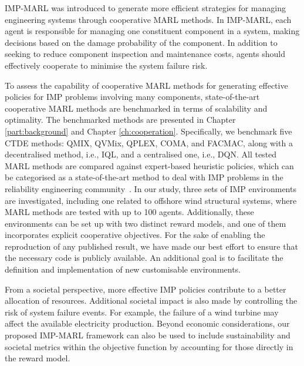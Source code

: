 IMP-MARL was introduced to generate more efficient strategies for managing engineering systems through cooperative MARL methods.
In IMP-MARL, each agent is responsible for managing one constituent component in a system, making decisions based on the damage probability of the component.
In addition to seeking to reduce component inspection and maintenance costs, agents should effectively cooperate to minimise the system failure risk.

To assess the capability of cooperative MARL methods for generating effective policies for IMP problems involving many components, state-of-the-art cooperative MARL methods are benchmarked in terms of scalability and optimality.
The benchmarked methods are presented in Chapter \ref{part:background} and Chapter \ref{ch:cooperation}.
Specifically, we benchmark five CTDE methods: QMIX, QVMix, QPLEX, COMA, and FACMAC, along with a decentralised method, i.e., IQL, and a centralised one, i.e., DQN.
All tested MARL methods are compared against expert-based heuristic policies, which can be categorised as a state-of-the-art method to deal with IMP problems in the reliability engineering community~\citep{LuqueDBN2019, morato2022optimal}.
In our study, three sets of IMP environments are investigated, including one related to offshore wind structural systems, where MARL methods are tested with up to 100 agents.
Additionally, these environments can be set up with two distinct reward models, and one of them incorporates explicit cooperative objectives.
For the sake of enabling the reproduction of any published result, we have made our best effort to ensure that the necessary code is publicly available.
An additional goal is to facilitate the definition and implementation of new customisable environments.

From a societal perspective, more effective IMP policies contribute to a better allocation of resources.
Additional societal impact is also made by controlling the risk of system failure events.
For example, the failure of a wind turbine may affect the available electricity production. 
Beyond economic considerations, our proposed IMP-MARL framework can also be used to include sustainability and societal metrics within the objective function by accounting for those directly in the reward model.

